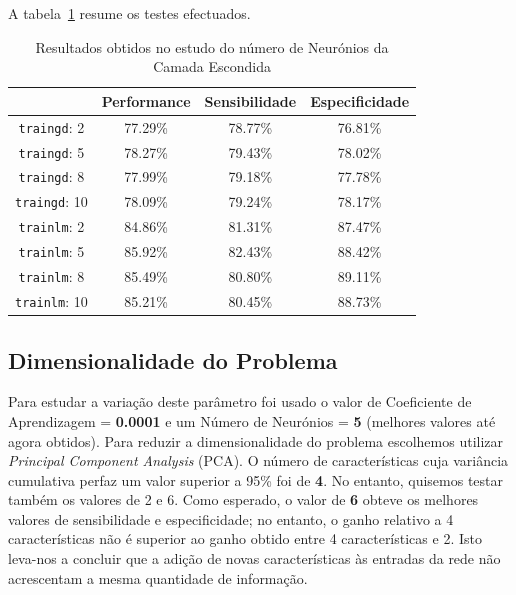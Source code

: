 \documentclass{article}
\begin{document}
A tabela~\ref{table_hidden_neurons} resume os testes efectuados.

\begin{table}[!h]
\centering
	\caption{Resultados obtidos no estudo do número de Neurónios da Camada Escondida}
	\label{table_hidden_neurons}
	\begin{tabular}{|c|c|c|c|}
	\hline 
	 & \textbf{Performance} & \textbf{Sensibilidade} & \textbf{Especificidade} \\ 
	\hline 
	\texttt{traingd}: 2 & 77.29\%  & 78.77\% & 76.81\% \\
	\hline 
	\texttt{traingd}: 5 & 78.27\% & 79.43\% & 78.02\% \\
	\hline 
	\texttt{traingd}: 8 & 77.99\% & 79.18\% & 77.78\% \\
	\hline
	\texttt{traingd}: 10 & 78.09\% & 79.24\% & 78.17\% \\
	\hline
	\texttt{trainlm}: 2 & 84.86\%  & 81.31\% & 87.47\% \\
	\hline 
	\texttt{trainlm}: 5 & 85.92\% & 82.43\% & 88.42\% \\
	\hline 
	\texttt{trainlm}: 8 & 85.49\% & 80.80\% & 89.11\% \\
	\hline
	\texttt{trainlm}: 10 & 85.21\% & 80.45\% & 88.73\% \\
	\hline    
	\end{tabular}
\end{table}


\subsection{Dimensionalidade do Problema}
\indent \indent Para estudar a variação deste parâmetro foi usado o valor de Coeficiente de Aprendizagem = \textbf{0.0001} e um Número de Neurónios = \textbf{5} (melhores valores até agora obtidos). Para reduzir a dimensionalidade do problema escolhemos utilizar \textit{Principal Component Analysis} (PCA). O número de características cuja variância cumulativa perfaz um valor superior a 95\% foi de \textbf{4}. No entanto, quisemos testar também os valores de 2 e 6. Como esperado, o valor de \textbf{6} obteve os melhores valores de sensibilidade e especificidade; no entanto, o ganho relativo a 4 características não é superior ao ganho obtido entre 4 características e 2. Isto leva-nos a concluir que a adição de novas características às entradas da rede não acrescentam a mesma quantidade de informação.
\end{document}
